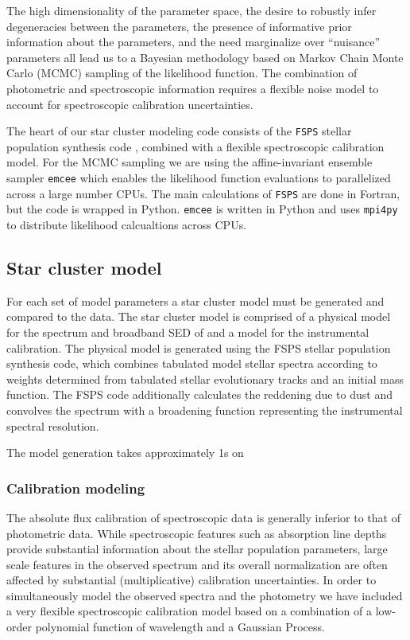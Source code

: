 \documentclass[11pt,preprint]{aastex}
\begin{document}
The high dimensionality of the parameter space, the desire to robustly infer degeneracies between the parameters, the presence of informative prior information about the parameters, and the need marginalize over ``nuisance'' parameters all lead us to a Bayesian methodology based on Markov Chain Monte Carlo (MCMC) sampling of the likelihood function. 
The combination of photometric and spectroscopic information requires a flexible noise model to account for spectroscopic calibration uncertainties.

The heart of our star cluster modeling code consists of the \texttt{FSPS} stellar population synthesis code \citep{fsps}, combined with a flexible spectroscopic calibration model.  
For the MCMC sampling we are using the affine-invariant ensemble sampler \texttt{emcee} \citep{emcee} which enables the likelihood function evaluations to parallelized across a large number CPUs. 
The main calculations of \texttt{FSPS} are done in Fortran, but the code is wrapped in Python.  \texttt{emcee} is written in Python and uses \texttt{mpi4py} to distribute likelihood calcualtions across CPUs.

\subsection{Star cluster model}
For each set of model parameters a star cluster model must be generated and compared to the data. 
The star cluster model is comprised of a physical model for the spectrum and broadband SED of and a model for the instrumental calibration.  
The physical model is generated using the FSPS stellar population synthesis code, which combines tabulated model stellar spectra according to weights determined from tabulated stellar evolutionary tracks and an initial mass function.  
The FSPS code additionally calculates the reddening due to dust and convolves the spectrum with a broadening function representing the instrumental spectral resolution.

The model generation takes approximately 1s on 

\subsubsection{Calibration modeling}
The absolute flux calibration of spectroscopic data is generally inferior to that of photometric data.  
While spectroscopic features such as absorption line depths provide substantial information about the stellar population parameters, large scale features in the observed spectrum and its overall normalization are often affected by substantial (multiplicative) calibration uncertainties. 
In order to simultaneously model the observed spectra and the photometry we have included a very flexible spectroscopic calibration model based on a combination of a low-order polynomial function of wavelength and a Gaussian Process.
\end{document}
